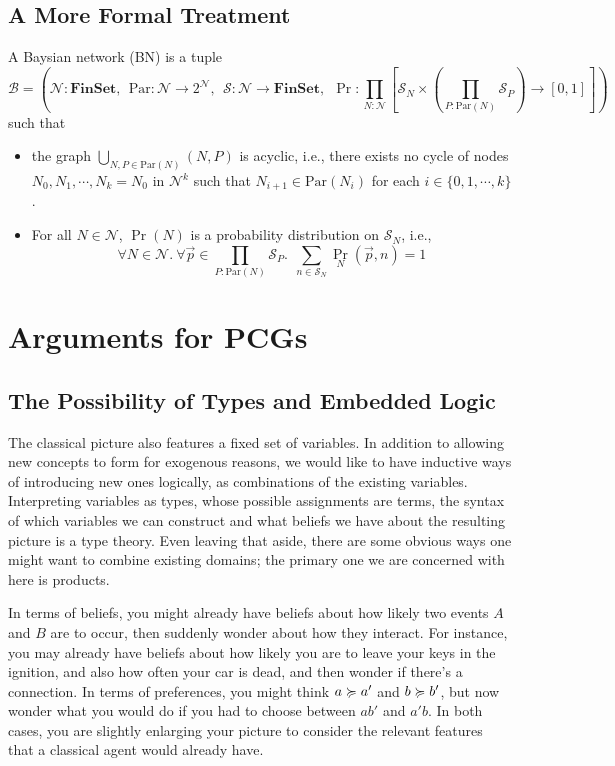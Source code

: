 \documentclass{article}
\begin{document}
	\subsection{A More Formal Treatment}
	\begin{defn}
		A Baysian network (BN) is a tuple
		\[
		\mathcal B = \left(\mathcal N : \mathbf{FinSet}, ~~\mathrm{Par}: \mathcal N \to 2^{\mathcal N},~~ \mathcal S: \mathcal N \to \mathbf{FinSet},~~\Pr: \prod_{N : \mathcal N}  \left[ \mathcal S_N \times \left(\prod_{P : \mathrm{Par}(N)} \mathcal S_P\right)  \to [0,1] \right] \right)
		\]
		such that
		\begin{itemize}[nosep]
			\item the graph $\bigcup_{N, P \in \mathrm{Par}(N)}(N, P)$ is acyclic, i.e., there exists no cycle of nodes $N_0, N_1, \cdots, N_k = N_0$ in $\mathcal N^k$ such that $N_{i+1} \in \mathrm{Par}(N_i)$ for each $i \in \{0, 1, \cdots, k\}$.
			\item For all $N \in \mathcal N$, $\Pr(N)$ is a probability distribution on $\mathcal S_N$, i.e., 
			\[ \forall N\in \mathcal N.~\forall \vec{p} \in {\prod_{P : \mathrm{Par}(N)} \mathcal S_P}.~~ \sum_{n \in \mathcal S_{N}} \Pr_N(\vec{p}, n) = 1\]
		\end{itemize}
	\end{defn}

	\section{Arguments for PCGs}
	\subsection{The Possibility of Types and Embedded Logic}\label{sec:belief-typing}
	The classical picture also features a fixed set of variables. In addition to allowing new concepts to form for exogenous reasons, we would like to have inductive ways of introducing new ones logically, as combinations of the existing variables. Interpreting variables as types, whose possible assignments are terms, the syntax of which variables we can construct and what beliefs we have about the resulting picture is a type theory. Even leaving that aside, there are some obvious ways one might want to combine existing domains; the primary one we are concerned with here is products.
	
	In terms of beliefs, you might already have beliefs about how likely two events $A$ and $B$ are to occur, then suddenly wonder about how they interact. For instance, you may already have beliefs about how likely you are to leave your keys in the ignition, and also how often your car is dead, and then wonder if there's a connection. 
	In terms of preferences, you might think $a \succcurlyeq a'$ and $b \succcurlyeq b'$, but now wonder what you would do if you had to choose between $a b'$ and $a' b$. In both cases, you are slightly enlarging your picture to consider the relevant features that a classical agent would already have.
	
\end{document}
